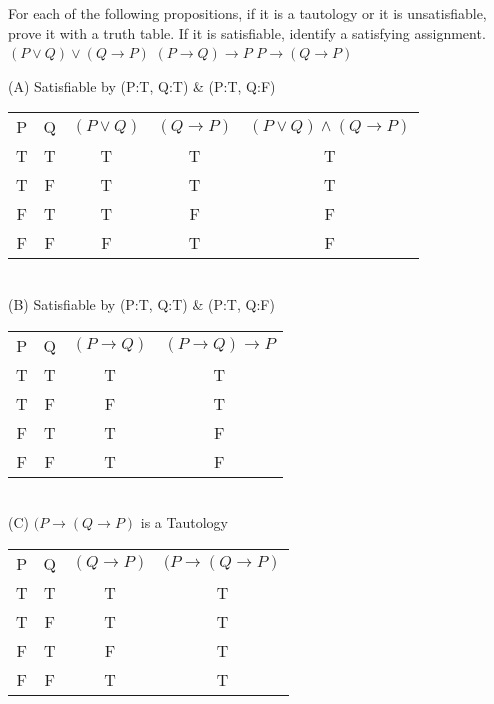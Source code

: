 \documentclass[solution,letterpaper]{cs20}
\begin{document}
\begin{problem}
For each of the following propositions, if it is a tautology or it is unsatisfiable, prove it with a truth table. If it is satisfiable, identify a satisfying assignment. 
\subproblem $(P \vee Q) \vee (Q \to P)$ 
\subproblem $(P \to Q) \to P$
\subproblem $P \to (Q \to P)$

\begin{solution}
(A) Satisfiable by (P:T, Q:T) \& (P:T, Q:F) \\
\begin{tabular}{c|c|c|c|c|}
    P & Q & $(P \lor Q)$ & $(Q \to P)$ & $(P \lor Q) \land (Q \to P)$\\
    T & T & T & T & T\\
    T & F & T & T & T\\
    F & T & T & F & F\\
    F & F & F & T & F\\
\end{tabular}
\label{tab:my_label} \\

(B) Satisfiable by (P:T, Q:T) \& (P:T, Q:F) \\
\begin{tabular}{c|c|c|c|}
    P & Q & $(P \to Q)$ & $(P \to Q) \to P$ \\
    T & T & T & T \\
    T & F & F & T \\
    F & T & T & F \\ 
    F & F & T & F \\
\end{tabular} \\

(C) $(P \to (Q \to P)$ is a Tautology \\
\begin{tabular}{c|c|c|c}
     P & Q & $(Q \to P)$ & $(P \to (Q \to P)$ \\
     T & T & T & T \\
     T & F & T & T \\
     F & T & F & T \\
     F & F & T & T \\
\end{tabular}
\end{solution}
\end{problem}
\pagebreak
\end{document}
